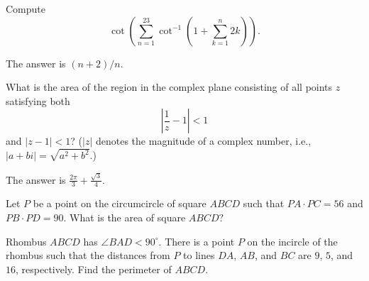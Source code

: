 \documentclass[11pt]{article}
\theoremstyle{definition}
\begin{document}
%	



\begin{question}[name={2022 Stanford Math Tournament, \href{https://artofproblemsolving.com/community/c383h3040234p27370695}{Algebra \#6}}]
	Compute
	\[\cot\left(\sum_{n=1}^{23}\cot^{-1}\left(1+\sum_{k=1}^n2k\right)\right).\]
\end{question}



\begin{solution}%
	The answer is $\boxed{(n+2)/n}$.
\end{solution}


\begin{question}[name={2022 Stanford Math Tournament, \href{https://artofproblemsolving.com/community/c383h3041180p27382234}{Algebra Tiebreaker \#2}}]
	What is the area of the region in the complex plane consisting of all points $z$ satisfying both $$\left|\frac{1}{z}-1\right|<1$$ and $|z-1|<1$? ($|z|$ denotes the magnitude of a complex number, i.e., $|a+bi|=\sqrt{a^2+b^2}$.)
\end{question}



\begin{solution}%
	The answer is $\boxed{\tfrac{2\pi}{3}+\tfrac{\sqrt{3}}{4}}$.
\end{solution}






\begin{question}[name={2023 AIME I, \href{https://artofproblemsolving.com/community/c4p27048721}{Problem 5}}]
	Let $P$ be a point on the circumcircle of square $ABCD$ such that $PA \cdot PC = 56$ and $PB \cdot PD = 90.$ What is the area of square $ABCD?$
\end{question}


%	












\begin{question}[name={2023 AIME I, \href{https://artofproblemsolving.com/community/c4p27048785}{Problem 8}}]
	Rhombus $ABCD$ has $\angle BAD<90^{\circ}$. There is a point $P$ on the incircle of the rhombus such that the distances from $P$ to lines $DA$, $AB$, and $BC$ are $9$, $5$, and $16$, respectively. Find the perimeter of $ABCD$.
\end{question}
\end{document}
